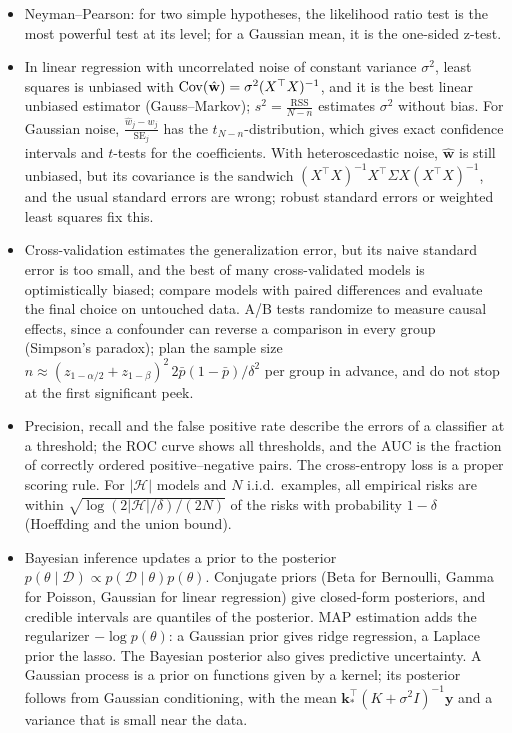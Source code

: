 \begin{itemize}[leftmargin=*]
    \item Neyman--Pearson: for two simple hypotheses, the likelihood ratio test is the most powerful test at its level; for a Gaussian mean, it is the one-sided z-test.
    \item In linear regression with uncorrelated noise of constant variance $\sigma^2$, least squares is unbiased with $\operatorname{Cov}(\hat{\mathbf{w}}) = \sigma^2(X^\top X)^{-1}$, and it is the best linear unbiased estimator (Gauss--Markov); $s^2 = \frac{\mathrm{RSS}}{N - n}$ estimates $\sigma^2$ without bias. For Gaussian noise, $\frac{\hat w_j - w_j}{\mathrm{SE}_j}$ has the $t_{N-n}$-distribution, which gives exact confidence intervals and $t$-tests for the coefficients. With heteroscedastic noise, $\hat{\mathbf{w}}$ is still unbiased, but its covariance is the sandwich $(X^\top X)^{-1}X^\top\Sigma X(X^\top X)^{-1}$, and the usual standard errors are wrong; robust standard errors or weighted least squares fix this.
    \item Cross-validation estimates the generalization error, but its naive standard error is too small, and the best of many cross-validated models is optimistically biased; compare models with paired differences and evaluate the final choice on untouched data. A/B tests randomize to measure causal effects, since a confounder can reverse a comparison in every group (Simpson's paradox); plan the sample size $n \approx (z_{1-\alpha/2} + z_{1-\beta})^2\,2\bar p(1 - \bar p)/\delta^2$ per group in advance, and do not stop at the first significant peek.
    \item Precision, recall and the false positive rate describe the errors of a classifier at a threshold; the ROC curve shows all thresholds, and the AUC is the fraction of correctly ordered positive--negative pairs. The cross-entropy loss is a proper scoring rule. For $|\mathcal{H}|$ models and $N$ i.i.d.\ examples, all empirical risks are within $\sqrt{\log(2|\mathcal{H}|/\delta)/(2N)}$ of the risks with probability $1 - \delta$ (Hoeffding and the union bound).
    \item Bayesian inference updates a prior to the posterior $p(\theta \mid \mathcal{D}) \propto p(\mathcal{D} \mid \theta)p(\theta)$. Conjugate priors (Beta for Bernoulli, Gamma for Poisson, Gaussian for linear regression) give closed-form posteriors, and credible intervals are quantiles of the posterior. MAP estimation adds the regularizer $-\log p(\theta)$: a Gaussian prior gives ridge regression, a Laplace prior the lasso. The Bayesian posterior also gives predictive uncertainty. A Gaussian process is a prior on functions given by a kernel; its posterior follows from Gaussian conditioning, with the mean $\mathbf{k}_*^\top(K + \sigma^2I)^{-1}\mathbf{y}$ and a variance that is small near the data.

\end{itemize}
